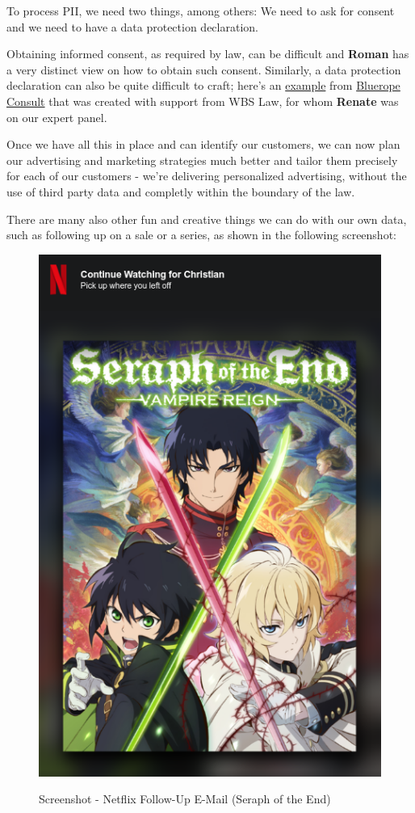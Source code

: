 To process PII, we need two things, among others: We need to ask for consent and we need to have a data protection declaration.

Obtaining informed consent, as required by law, can be difficult and \textbf{Roman} has a very distinct view on how to obtain such consent. Similarly, a data protection declaration can also be quite difficult to craft; here's an \href{https://blueropeconsultonline.de/datenschutz/}{example} from \href{https://blueropeconsultonline.de/}{Bluerope Consult} that was created with support from WBS Law, for whom \textbf{Renate} was on our expert panel.

Once we have all this in place and can identify our customers, we can now plan our advertising and marketing strategies much better and tailor them precisely for each of our customers - we're delivering personalized advertising, without the use of third party data and completly within the boundary of the law.

There are many also other fun and creative things we can do with our own data, such as following up on a sale or a series, as shown in the following screenshot:

\begin{figure}[H]
\centering
\caption {Screenshot - Netflix Follow-Up E-Mail (Seraph of the End)}
\includegraphics[scale=0.6]{images/continue-seraph.png}
\label{fig:seraph}
\end{figure}

